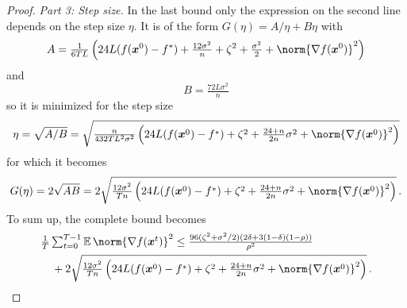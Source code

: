 \documentclass{article}
\begin{document}
\begin{proof}
  \textit{Part 3: Step size.} In the last bound only the expression on the second line depends on the step size $\eta$. It is of the form $G(\eta) = A / \eta + B \eta$ with 
  \[
    A 
    = 
    \tfrac{1}{6TL}
    \left(
      24L(f(\xx^0) - f^\ast)
      +
      \tfrac{12\sigma^2}{n}
      +
      \zeta^2
      + 
      \tfrac{\sigma^2}{2}
      +
      \norm{\nabla f(\xx^0) }^2
    \right)
  \]
  and
  \[
    B 
    =     
    \tfrac{72 L \sigma^2}{n}  
  \]
  so it is minimized for the step size 
  \[
    \eta 
    = 
    \sqrt{A/B}
    =
    \sqrt{
      \tfrac{n}{432 T L^2 \sigma^2}
      \left(
        24L(f(\xx^0) - f^\ast)
        +
        \zeta^2
        +
        \tfrac{24+n}{2n} \sigma^2 
        +
        \norm{\nabla f(\xx^0) }^2
      \right)
    }
  \] 
  for which it becomes
  \begin{align*}
    G(\eta)
    =
    2 \sqrt{A B}
    =
    2 \sqrt{
    \tfrac{12 \sigma^2}{T n}
    \left(
      24L(f(\xx^0) - f^\ast)
      +
      \zeta^2
      +
      \tfrac{24+n}{2n} \sigma^2 
      +
      \norm{\nabla f(\xx^0) }^2
    \right)
    }
    \, .
  \end{align*}
  To sum up, the complete bound becomes
  \begin{align*}
    & \tfrac{1}{T} \tsum_{t=0}^{T-1} \E \norm{\nabla f(\xx^t)}^2 
    \le  
    \tfrac{96(\zeta^2 + \sigma^2/2)(2 \delta + 3(1-\delta)(1-\rho))}{\rho^2} 
    \\
    &\quad 
    + 2 \sqrt{
    \tfrac{12 \sigma^2 }{T n}
    \left(
      24L(f(\xx^0) - f^\ast)
      +
      \zeta^2
      +
      \tfrac{24+n}{2n} \sigma^2 
      +
      \norm{\nabla f(\xx^0) }^2
    \right)
    }
    \, .
  \end{align*}

\end{proof}
\end{document}
